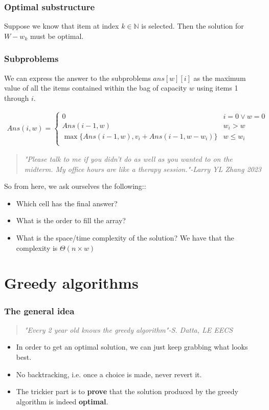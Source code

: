 \documentclass[12pt]{book}
\begin{document}
\subsection*{Optimal substructure}

Suppose we know that item at index $k\in \mathbb{N}$ is selected. Then the solution for $W-w_k$ must be optimal.

\subsection*{Subproblems}
We can express the answer to the subproblems $ans[w][i]$ as the maximum value of all the items contained within the bag of capacity $w$ using items 1 through $i$.

\begin{align*}
    Ans(i,w)=\begin{cases}
        0&i=0\lor w=0\\
        Ans(i-1,w)&w_i>w\\
        \max\{Ans(i-1,w),v_i+Ans(i-1,w-w_i)\}&w\leq w_i\\
    \end{cases}
\end{align*}

\begin{quote}
    \textit{"Please talk to me if you didn't do as well as you wanted to on the midterm. My office hours are like a therapy session."-Larry YL Zhang 2023}
\end{quote}

So from here, we ask ourselves the following::

\begin{itemize}
    \item Which cell has the final answer?
    \item What is the order to fill the array?
    \item What is the space/time complexity of the solution? We have that the complexity is $\Theta (n\times w)$
\end{itemize}

\chapter*{Greedy algorithms}

\subsection*{The general idea}
\begin{quote}
    \textit{"Every 2 year old knows the greedy algorithm"-S. Datta, LE EECS}
\end{quote}
\begin{itemize}
    \item In order to get an optimal solution, we can just keep grabbing what looks best.
    \item No backtracking, i.e. once a choice is made, never revert it.
    \item The trickier part is to \textbf{prove} that the solution produced by the greedy algorithm is indeed \textbf{optimal}.
\end{itemize}
\end{document}
